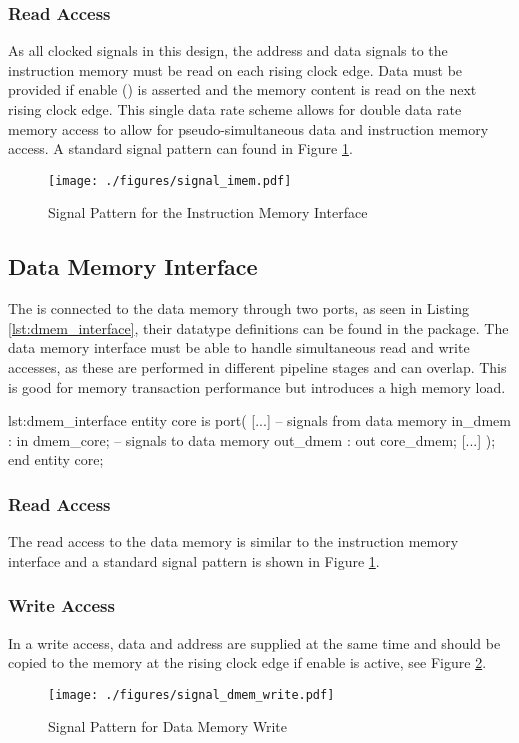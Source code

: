 \subsubsection{Read Access}
As all clocked signals in this design, the address and data signals to the instruction memory must be read on each rising clock edge.
Data must be provided if enable () is asserted and the memory content is read on the next rising clock edge.
This single data rate scheme allows for double data rate memory access to allow for pseudo-simultaneous data and instruction memory access.
A standard signal pattern can found in Figure \ref{fig:signal_imem}.

\begin{figure}[htb]
\centering
\texttt{[image: ./figures/signal\_imem.pdf]}
\caption{Signal Pattern for the Instruction Memory Interface}
\label{fig:signal_imem}
\end{figure}

\subsection{Data Memory Interface}
The \procname is connected to the data memory through two ports, as seen in Listing \ref{lst:dmem_interface}, their datatype definitions can be found in the  package.
The data memory interface must be able to handle simultaneous read and write accesses, as these are performed in different pipeline stages and can overlap.
This is good for memory transaction performance but introduces a high memory load.

\begin{vhdl}{lst:dmem_interface}
entity core is
port(
	[...]
	-- signals from data memory
	in_dmem   : in  dmem_core;
	-- signals to data memory
	out_dmem  : out core_dmem;
	[...]
);
end entity core;
\end{vhdl}

\subsubsection{Read Access}
The read access to the data memory is similar to the instruction memory interface and a standard signal pattern is shown in Figure \ref{fig:signal_imem}.

\subsubsection{Write Access}
In a write access, data and address are supplied at the same time and should be copied to the memory at the rising clock edge if enable is active, see Figure \ref{fig:signal_dmem_write}.
\begin{figure}[htb]
	\centering
	\texttt{[image: ./figures/signal\_dmem\_write.pdf]}
	\caption{Signal Pattern for Data Memory Write}
	\label{fig:signal_dmem_write}
\end{figure}
